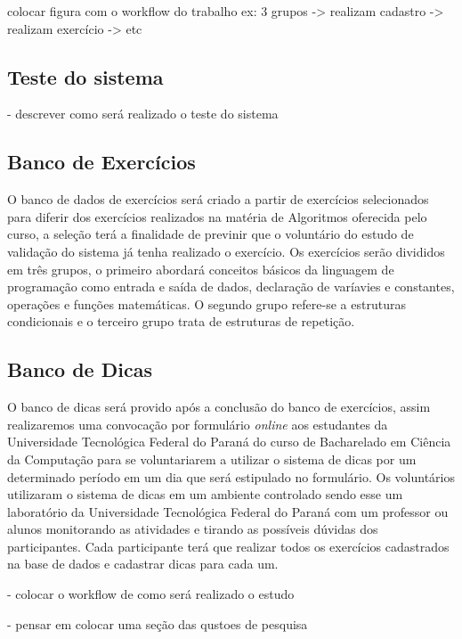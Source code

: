 colocar figura com o workflow do trabalho
ex: 3 grupos -> realizam cadastro -> realizam exercício -> etc

\subsection{Teste do sistema}

- descrever como será realizado o teste do sistema

\subsection{Banco de Exercícios}

O banco de dados de exercícios será criado a partir de exercícios selecionados para diferir dos exercícios realizados na matéria de Algoritmos oferecida pelo curso, a seleção terá a finalidade de previnir que o voluntário do estudo de validação do sistema já tenha realizado o exercício. Os exercícios serão divididos em três grupos, o primeiro abordará conceitos básicos da linguagem de programação como entrada e saída de dados, declaração de varíavies e constantes, operações e funções matemáticas. O segundo grupo refere-se a estruturas condicionais e o terceiro grupo trata de estruturas de repetição.

\subsection{Banco de Dicas}

O banco de dicas será provido após a conclusão do banco de exercícios, assim realizaremos uma convocação por formulário \textit{online} aos estudantes da Universidade Tecnológica Federal do Paraná do curso de Bacharelado em Ciência da Computação para se voluntariarem a utilizar o sistema de dicas por um determinado período em um dia que será estipulado no formulário. Os voluntários utilizaram o sistema de dicas em um ambiente controlado sendo esse um laboratório da Universidade Tecnológica Federal do Paraná com um professor ou alunos monitorando as atividades e tirando as possíveis dúvidas dos participantes. Cada participante terá que realizar todos os exercícios cadastrados na base de dados e cadastrar dicas para cada um.

- colocar o workflow de como será realizado o estudo

- pensar em colocar uma seção das qustoes de pesquisa